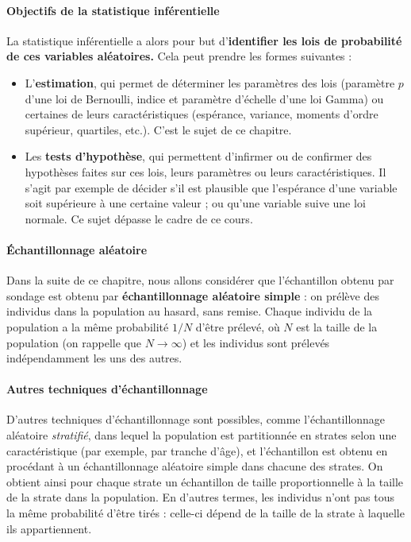 \paragraph{Objectifs de la statistique inférentielle} La statistique
inférentielle a alors pour but d'\textbf{identifier les lois de probabilité de ces
  variables aléatoires.} Cela peut prendre les
formes suivantes :
\begin{itemize}
\item L'\textbf{estimation}, qui permet de déterminer les paramètres des lois (paramètre
  $p$ d'une loi de Bernoulli, indice et paramètre d'échelle d'une loi Gamma) ou
  certaines de leurs caractéristiques (espérance, variance, moments d'ordre
  supérieur, quartiles, etc.). C'est le sujet de ce chapitre.
\item Les \textbf{tests d'hypothèse}, qui permettent d'infirmer ou de confirmer des
  hypothèses faites sur ces lois, leurs paramètres ou leurs
  caractéristiques. Il s'agit par exemple de décider s'il est plausible que
  l'espérance d'une variable soit supérieure à une certaine valeur ; ou qu'une
  variable suive une loi normale. Ce sujet dépasse le cadre de ce cours.
\end{itemize}

\paragraph{Échantillonnage aléatoire}
Dans la suite de ce chapitre, nous allons considérer que l'échantillon obtenu
par sondage est obtenu par \textbf{échantillonnage aléatoire simple} : on
prélève des individus dans la population au hasard, sans remise. Chaque
individu de la population a la même probabilité $1/N$ d'être prélevé, où $N$
est la taille de la population (on rappelle que $N \rightarrow \infty$) et les 
individus sont prélevés indépendamment les uns des autres.

\paragraph{Autres techniques d'échantillonnage} D'autres techniques
d'échantillonnage sont possibles, comme l'échantillonnage aléatoire
\textit{stratifié}, dans lequel la population est partitionnée en strates selon
une caractéristique (par exemple, par tranche d'âge), et l'échantillon est
obtenu en procédant à un échantillonnage aléatoire simple dans chacune des
strates. On obtient ainsi pour chaque strate un échantillon de taille
proportionnelle à la taille de la strate dans la population. En d'autres
termes, les individus n'ont pas tous la même probabilité d'être tirés :
celle-ci dépend de la taille de la strate à laquelle ils appartiennent.

